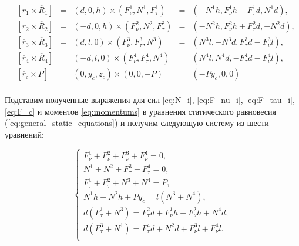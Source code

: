 \begin{equation}
\label{eq:momentums}
  \begin{alignedat}{3}
    &[\overline{r}_1\times\overline{R}_1] &=&  (d,0,h)\times(F_\nu^1, N^1, F_\tau^1) &=& (-N^1h,F_\nu^1h - F_\tau^1d,N^1d),  \\
    &[\overline{r}_2\times\overline{R}_2] &=& (-d,0,h)\times(F_\nu^2, N^2, F_\tau^2) &=& (-N^2h,F_\nu^2h + F_\tau^2d,-N^2d), \\
    &[\overline{r}_3\times\overline{R}_3] &=&  (d,l,0)\times(F_\nu^3, F_\tau^3, N^3) &=& (N^3l,-N^3d, F_\tau^3d-F_\nu^3l), \\
    &[\overline{r}_4\times\overline{R}_4] &=& (-d,l,0)\times(F_\nu^4, F_\tau^4, N^4) &=& (N^4l, N^4d,-F_\tau^4d-F_\nu^4l),\\
    &[\overline{r}_c\times\overline{P}]   &=&  (0, y_c, z_c)\times(0,0,-P) &=& (-Py_c,0,0)\\
  \end{alignedat}
\end{equation}

Подставим полученные выражения для сил \ref{eq:N_i}, \ref{eq:F_nu_i}, \ref{eq:F_tau_i}, \ref{eq:F_c} и моментов \ref{eq:momentums} в уравнения статического равновесия (\ref{eq:general_static_equations}) и получим следующую систему из шести уравнений:

\begin{equation}
  \label{eq:case1_initial}
  \left\{
    \begin{alignedat}{3}  
      F_\nu^1 + F_\nu^2 + F_\nu^3 + F_\nu^4 = 0, \\
      N^1 + N^2 + F_\tau^3 + F_\tau^4 = 0, \\
      F_\tau^1 + F_\tau^2 + N^3 + N^4 = P, \\
      N^1h + N^2h + Py_c = l(N^3 + N^4), \\
      d(F_\tau^1 + N^3) = F_\tau^2d + F_\nu^1h + F_\nu^2h + N^4d, \\
      d(F_\tau^3 + N^1) = F_\tau^4d + N^2d +F_\nu^3l + F_\nu^4l.\\
    \end{alignedat}
  \right.
\end{equation}



